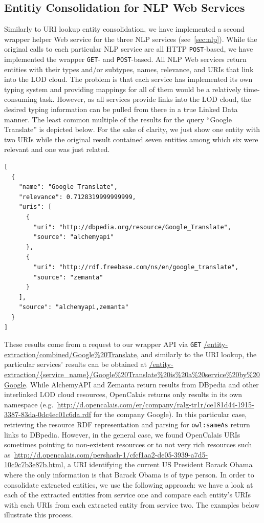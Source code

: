 \documentclass[conference]{IEEEtran}
\newcommand{\nofootnote}[1]{~#1}
\begin{document}
\subsection{Entitiy Consolidation for NLP Web Services}                     \label{sec:consolidation-nlp}
Similarly to URI lookup entity consolidation, we have implemented a second wrapper helper Web service for the three NLP services (see~\ref{sec:nlp}). While the
original calls to each particular NLP service are all HTTP \texttt{POST}-based, we have implemented the wrapper
\texttt{GET}- and \texttt{POST}-based. All NLP Web services return entities with their types and/or subtypes, names,
relevance, and URIs that link into the LOD cloud. The problem is that each service has implemented its own typing
system and providing mappings for all of them would be a relatively time-consuming task. However, as all services
provide links into the LOD cloud, the desired typing information can be pulled from there in a true Linked Data manner. The least common
multiple of the results for the query ``Google Translate'' is depicted below. For the sake of clarity, we just show one
entity with two URIs while the original result contained seven entities among which six were relevant and one was just
related.
\begin{lstlisting}
[
  {
    "name": "Google Translate",
    "relevance": 0.7128319999999999,
    "uris": [
      {
        "uri": "http://dbpedia.org/resource/Google_Translate",
        "source": "alchemyapi"
      },
      {
        "uri": "http://rdf.freebase.com/ns/en/google_translate",
        "source": "zemanta"
      }
    ],
    "source": "alchemyapi,zemanta"
  }
]
\end{lstlisting}

These results come from a request to our wrapper API via \texttt{GET} \url{/entity-extraction/combined/Google%20Translate},
and similarly to the URI lookup, the particular services' results can be obtained at \url{/entity-extraction/{service_name}/Google%20Translate%20is%20a%20service%20by%20Google}.
While AlchemyAPI and Zemanta return results from DBpedia and other interlinked LOD cloud resources, OpenCalais returns
only results in its own namespace
(e.g.\nofootnote{\url{http://d.opencalais.com/er/company/ralg-tr1r/ce181d44-1915-3387-83da-0dc4ec01c6da.rdf}} for the
company Google). In this particular case, retrieving the resource RDF representation and parsing for
\texttt{owl:sameAs} return links to DBpedia. However, in the general case, we found OpenCalais URIs sometimes pointing
to non-existent resources or to not very rich resources such
as\nofootnote{\url{http://d.opencalais.com/pershash-1/cfcf1aa2-de05-3939-a7d5-10c9c7b3e87b.html}}, a URI identifying
the current US President Barack Obama where the only information is that Barack Obama is of type person. In order to
consolidate extracted entities, we use the following approach: we have a look at each of the extracted entities from
service one and compare each entity's URIs with each URIs from each extracted entity from service two. The examples
below illustrate this process.
\end{document}
